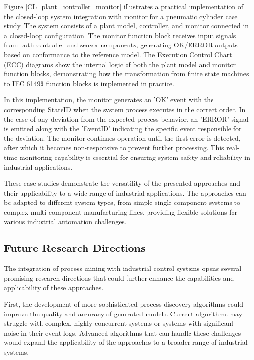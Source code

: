 Figure \ref{CL_plant_controller_monitor} illustrates a practical implementation of the closed-loop system integration with monitor for a pneumatic cylinder case study. The system consists of a plant model, controller, and monitor connected in a closed-loop configuration. The monitor function block receives input signals from both controller and sensor components, generating OK/ERROR outputs based on conformance to the reference model. The Execution Control Chart (ECC) diagrams show the internal logic of both the plant model and monitor function blocks, demonstrating how the transformation from finite state machines to IEC 61499 function blocks is implemented in practice.

In this implementation, the monitor generates an 'OK' event with the corresponding StateID when the system process executes in the correct order. In the case of any deviation from the expected process behavior, an 'ERROR' signal is emitted along with the 'EventID' indicating the specific event responsible for the deviation. The monitor continues operation until the first error is detected, after which it becomes non-responsive to prevent further processing. This real-time monitoring capability is essential for ensuring system safety and reliability in industrial applications.

These case studies demonstrate the versatility of the presented approaches and their applicability to a wide range of industrial applications. The approaches can be adapted to different system types, from simple single-component systems to complex multi-component manufacturing lines, providing flexible solutions for various industrial automation challenges.

\subsection{Future Research Directions}

The integration of process mining with industrial control systems opens several promising research directions that could further enhance the capabilities and applicability of these approaches.

First, the development of more sophisticated process discovery algorithms could improve the quality and accuracy of generated models. Current algorithms may struggle with complex, highly concurrent systems or systems with significant noise in their event logs. Advanced algorithms that can handle these challenges would expand the applicability of the approaches to a broader range of industrial systems.

